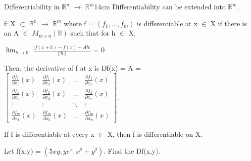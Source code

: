     \vspace{0.5cm}



    \begin{definition}{Differentiability in $\mathbb{R}^n$
    $\rightarrow$ $\mathbb{R}^m$}{14cm}
        Differentiability can be extended into $\mathbb{R}^m$.

        f: X $\subset$ $\mathbb{R}^n$ $\rightarrow$ $\mathbb{R}^m$
        where f = $(f_1,...,f_m)$
        is differentiable at x $\in$ X if there is an
        A $\in$ $M_{m \times n}(\mathbb{R})$ such that for h $\in$ X:

        \hspace{0.5cm}
        $\lim_{h \rightarrow 0}$ $\frac{|f(x+h)-f(x)-Ah|}{||h||}$ = 0

        Then, the derivative of f at x is Df(x) = A =
        $
        \begin{bmatrix}
            \frac{\partial f_1}{\partial x_1}(x)
            & \frac{\partial f_1}{\partial x_2}(x)
            & ...
            & \frac{\partial f_1}{\partial x_n}(x) \\

            \frac{\partial f_2}{\partial x_1}(x)
            & \frac{\partial f_2}{\partial x_2}(x)
            & ...
            & \frac{\partial f_2}{\partial x_n}(x) \\

            \vdots & \vdots & \ddots & \vdots \\
            
            \frac{\partial f_m}{\partial x_1}(x)
            & \frac{\partial f_m}{\partial x_2}(x)
            & ...
            & \frac{\partial f_m}{\partial x_n}(x)
        \end{bmatrix}
        $.

        If f is differentiable at every x $\in$ X, then f is differentiable on X.
    \end{definition}
    
    \vspace{0.5cm}



    \begin{example}
        Let f(x,y) = $(5xy,ye^x,x^2+y^2)$. Find the Df(x,y).
    \end{example}

